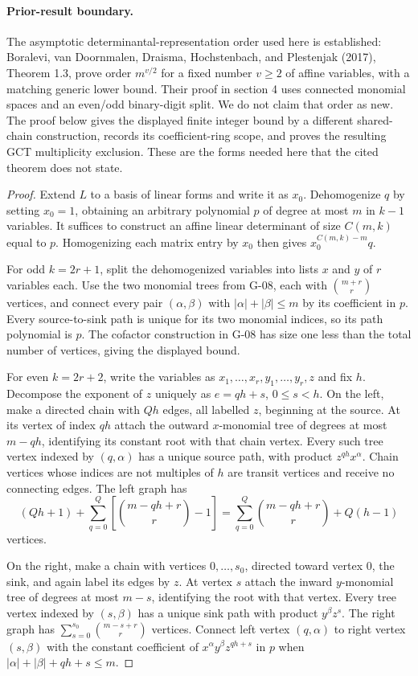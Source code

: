 \documentclass[11pt,a4paper]{article}
\theoremstyle{definition}\newtheorem{definition}{Definition}
\begin{document}
\paragraph{Prior-result boundary.}
The asymptotic determinantal-representation order used here is established: Boralevi, van Doornmalen, Draisma, Hochstenbach, and Plestenjak (2017), Theorem 1.3, prove order $m^{v/2}$ for a fixed number $v\geq2$ of affine variables, with a matching generic lower bound. Their proof in section 4 uses connected monomial spaces and an even/odd binary-digit split. We do not claim that order as new. The proof below gives the displayed finite integer bound by a different shared-chain construction, records its coefficient-ring scope, and proves the resulting GCT multiplicity exclusion. These are the forms needed here that the cited theorem does not state.
\begin{proof}
Extend $L$ to a basis of linear forms and write it as $x_0$. Dehomogenize $q$ by setting $x_0=1$, obtaining an arbitrary polynomial $p$ of degree at most $m$ in $k-1$ variables. It suffices to construct an affine linear determinant of size $C(m,k)$ equal to $p$. Homogenizing each matrix entry by $x_0$ then gives $x_0^{C(m,k)-m}q$.

For odd $k=2r+1$, split the dehomogenized variables into lists $x$ and $y$ of $r$ variables each. Use the two monomial trees from G-08, each with $\binom{m+r}{r}$ vertices, and connect every pair $(\alpha,\beta)$ with $|\alpha|+|\beta|\leq m$ by its coefficient in $p$. Every source-to-sink path is unique for its two monomial indices, so its path polynomial is $p$. The cofactor construction in G-08 has size one less than the total number of vertices, giving the displayed bound.

For even $k=2r+2$, write the variables as $x_1,\ldots,x_r,y_1,\ldots,y_r,z$ and fix $h$. Decompose the exponent of $z$ uniquely as $e=qh+s$, $0\leq s<h$. On the left, make a directed chain with $Qh$ edges, all labelled $z$, beginning at the source. At its vertex of index $qh$ attach the outward $x$-monomial tree of degrees at most $m-qh$, identifying its constant root with that chain vertex. Every such tree vertex indexed by $(q,\alpha)$ has a unique source path, with product $z^{qh}x^\alpha$. Chain vertices whose indices are not multiples of $h$ are transit vertices and receive no connecting edges. The left graph has
\[
 (Qh+1)+\sum_{q=0}^Q\left[\binom{m-qh+r}{r}-1\right]
 =\sum_{q=0}^Q\binom{m-qh+r}{r}+Q(h-1)
\]
vertices.

On the right, make a chain with vertices $0,\ldots,s_0$, directed toward vertex $0$, the sink, and again label its edges by $z$. At vertex $s$ attach the inward $y$-monomial tree of degrees at most $m-s$, identifying the root with that vertex. Every tree vertex indexed by $(s,\beta)$ has a unique sink path with product $y^\beta z^s$. The right graph has $\sum_{s=0}^{s_0}\binom{m-s+r}{r}$ vertices. Connect left vertex $(q,\alpha)$ to right vertex $(s,\beta)$ with the constant coefficient of $x^\alpha y^\beta z^{qh+s}$ in $p$ when $|\alpha|+|\beta|+qh+s\leq m$.


\end{proof}
\end{document}
